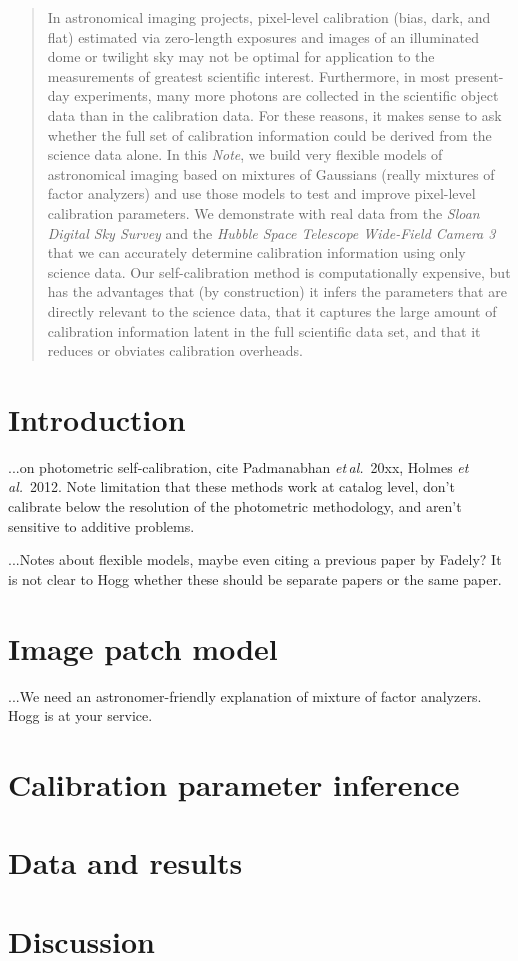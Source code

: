 \documentclass[12pt]{article}
\newcommand{\documentname}{\textsl{Note}}
\newcommand{\foreign}[1]{\textsl{#1}}
\newcommand{\etal}{\foreign{et\,al.}}
\newcommand{\project}[1]{\textsl{#1}}
\begin{document}
\sloppy\sloppypar


\begin{abstract}
In astronomical imaging projects, pixel-level calibration (bias, dark,
and flat) estimated via zero-length exposures and images of an
illuminated dome or twilight sky may not be optimal for application to
the measurements of greatest scientific interest.  Furthermore, in
most present-day experiments, many more photons are collected in the
scientific object data than in the calibration data.  For these
reasons, it makes sense to ask whether the full set of calibration
information could be derived from the science data alone.  In this
\documentname, we build very flexible models of astronomical imaging
based on mixtures of Gaussians (really mixtures of factor analyzers)
and use those models to test and improve pixel-level calibration
parameters.  We demonstrate with real data from the \project{Sloan
  Digital Sky Survey} and the \project{Hubble Space Telescope
  Wide-Field Camera 3} that we can accurately determine calibration
information using only science data.  Our self-calibration method is
computationally expensive, but has the advantages that (by
construction) it infers the parameters that are directly relevant to
the science data, that it captures the large amount of calibration information latent
in the full scientific data set, and that it reduces or obviates
calibration overheads.
\end{abstract}

\section{Introduction}

...on photometric self-calibration, cite Padmanabhan \etal~20xx, Holmes
\etal~2012.  Note limitation that these methods work at catalog level,
don't calibrate below the resolution of the photometric methodology,
and aren't sensitive to additive problems.

...Notes about flexible models, maybe even citing a previous paper by
Fadely?  It is not clear to Hogg whether these should be separate
papers or the same paper.

\section{Image patch model}

...We need an astronomer-friendly explanation of mixture of factor
analyzers.  Hogg is at your service.

\section{Calibration parameter inference}

\section{Data and results}

\section{Discussion}
\end{document}

